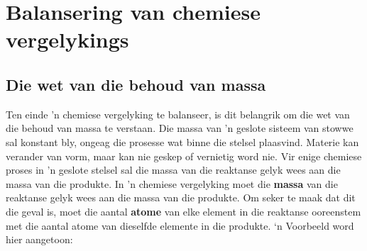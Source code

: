   \label{m38721**end}
         \section{Balansering van chemiese vergelykings}
    \nopagebreak


            \subsection*{Die wet van die behoud van massa}
            \nopagebreak
Ten einde 'n chemiese vergelyking te balanseer, is dit belangrik om die wet van die behoud van massa te verstaan.
 {Die massa van 'n geslote sisteem van stowwe sal konstant bly, ongeag die prosesse wat binne die stelsel plaasvind. Materie kan verander van vorm, maar kan nie geskep of vernietig word nie. Vir enige chemiese proses in 'n geslote stelsel sal die massa van die reaktanse  gelyk wees aan die massa van die produkte. } 
In 'n chemiese vergelyking moet die \textbf{massa} van die reaktanse gelyk wees aan die massa van die produkte. Om seker te maak dat dit die geval is, moet die aantal \textbf{atome} van elke element in die reaktanse ooreenstem met die aantal atome van dieselfde elemente in die produkte. ‘n Voorbeeld word hier aangetoon:
